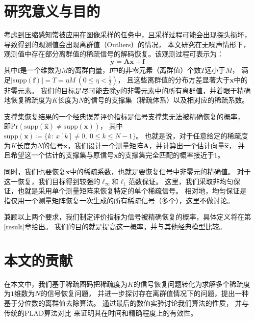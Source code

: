 \documentclass[AutoFakeBold]{LZUThesis}
\begin{document}
\section{研究意义与目的}

考虑到压缩感知常被应用在图像采样的任务中，且采样过程可能会出现探头损坏，导致得到的观测值会出现离群值（Outliers）的情况，
本文研究在无噪声情形下，观测值中存在部分离群值的稀疏信号的解码恢复。该观测过程可表示为：
\begin{equation}
    \mathbf{y} = \mathbf{Ax} + \mathbf{f}
\end{equation}
其中$\mathbf{f}$是一个维数为$M$的离群向量，$\mathbf{f}$中的非零元素（离群值）个数$T$远小于$M$，
满足$\left | \mathrm{supp} (\mathbf{f}) \right | = T = \eta M \ (0 \leq \eta < \frac{1}{2})$，
且这些离群值的分布方差显著大于$\mathbf{x}$中的非零元素。
我们的目标是尽可能去除$\mathbf{y}$的非零元素中的所有离群值，并着眼于精确地恢复稀疏度为$K$长度为$N$的信号的支撑集（稀疏体系）以及相对应的稀疏系数。

支撑集恢复结果的一个经典误差评价指标是信号支撑集无法被精确恢复的概率，
即$\mathrm{Pr}(\mathrm{supp}(\hat{\mathbf{x}}) \neq \mathrm{supp}(\mathbf{x}))$，
其中$\mathrm{supp}(\mathbf{x}) \coloneq \{k:\ x[k] \neq 0,\ 0 \leq k \leq N-1\}$。
也就是说，对于任意给定的稀疏度为$K$长度为$N$的信号$\mathbf{x}$，我们设计一个测量矩阵$\mathbf{A}$，并计算出一个估计向量$\hat{\mathbf{x}}$，
并且希望这一个估计的支撑集与原信号$\mathbf{x}$的支撑集完全匹配的概率接近于$1$。

同时，我们也要恢复$\mathbf{x}$中的稀疏系数，也就是要恢复信号中非零元的精确值。
对于这一恢复，我们目标得到较强的$\ell_{\infty}$和$\ell_{1}$范数保证。 
这里，我们采取非均匀保证\cite{gilbert2010sparse}，也就是采用单个测量矩阵来恢复特定的单个稀疏信号。
相对地，均匀保证是指仅用一个测量矩阵恢复一次生成的所有稀疏信号（多个），这里不做讨论。

兼顾以上两个要求，我们制定评价指标为信号被精确恢复的概率，具体定义将在第\ref{result}章给出。
我们的目的就是提高这一概率，并与其他经典模型比较。

\section{本文的贡献}

在本文中，我们基于稀疏图码把稀疏度为$K$的信号恢复问题转化为求解多个稀疏度为$1$维数为$N$的信号恢复问题，
并进一步探讨存在离群值情况下的问题，提出一种基于分位数的离群值去除算法。
通过最后的数值实验讨论我们算法的性质，
并与传统的PLAD算法\cite{doi:10.1137/090777761, WANG2013135}对比
来证明其在时间和精确程度上的有效性。
\end{document}
